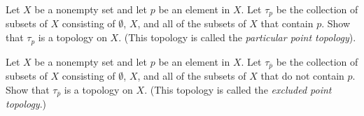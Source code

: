 \item \label{ex:particular_point_topology} Let $X$ be a nonempty set and let $p$ be an element in $X$. Let $\tau_p$ be the collection of subsets of $X$ consisting of $\emptyset$, $X$, and all of the subsets of $X$ that contain $p$. Show that $\tau_p$ is a topology on $X$. (This topology is called the \emph{particular point topology}).

\begin{comment}

\ExerciseSolution By definition, we have $\emptyset$ and $X$ in $\tau_p$. Let $\{A_{\alpha}\}$ be a collection of sets in $\tau_p$. If $A_{\alpha} = \emptyset$ for each $\alpha \in I$, then $\bigcup_{\alpha \in I} A_{\alpha} = \emptyset$. This places $\bigcup_{\alpha \in I} A_{\alpha}$ in $\tau_p$. Suppose there is a $\beta \in I$ such that $A_{\alpha} \neq \emptyset$. Then $p \in A_{\beta} \subseteq \bigcup_{\alpha \in I} A_{\alpha}$ and $\bigcup_{\alpha \in I} A_{\alpha}$ is in $\tau_p$. We conclude that $\tau_p$ is closed under arbitrary unions. 

Now suppose that $I$ is a finite set. If $A_{\alpha} = \emptyset$ for any $\alpha \in I$, then $\bigcap_{\alpha \in I} A_{\alpha} = \emptyset$ is in $\tau_P$. Assume $A_{\alpha} \neq \emptyset$ for every $\alpha \in I$. Then $p \in A_{\alpha}$ for  every $\alpha$ in $I$, and $p \in \bigcap_{\alpha \in I} A_{\alpha}$ and .$\bigcap_{\alpha \in I} A_{\alpha} \in \tau_p$. Thus, $\tau_p$ is closed under finite intersections. We conclude that $\tau_p$ is a topology on $X$.
\end{comment}

\item \label{ex:excluded_point_topology} Let $X$ be a nonempty set and let $p$ be an element in $X$. Let $\tau_{\overline{p}}$ be the collection of subsets of $X$ consisting of $\emptyset$, $X$, and all of the subsets of $X$ that do not contain $p$. Show that $\tau_{\overline{p}}$ is a topology on $X$. (This topology is called the \emph{excluded point topology}.)

